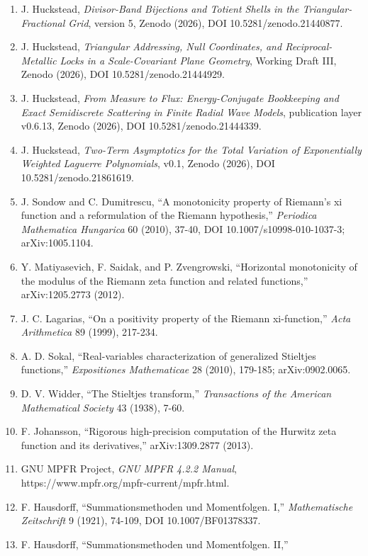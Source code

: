 \documentclass[
  11pt,
]{book}
\begin{document}
\begin{enumerate}
{  Mathematical Society} 296 (1986), 521-541.
\item
  J. Huckstead, \emph{Divisor-Band Bijections and Totient Shells in the
  Triangular-Fractional Grid}, version 5, Zenodo (2026), DOI
  10.5281/zenodo.21440877.
\item
  J. Huckstead, \emph{Triangular Addressing, Null Coordinates, and
  Reciprocal-Metallic Locks in a Scale-Covariant Plane Geometry},
  Working Draft III, Zenodo (2026), DOI 10.5281/zenodo.21444929.
\item
  J. Huckstead, \emph{From Measure to Flux: Energy-Conjugate Bookkeeping
  and Exact Semidiscrete Scattering in Finite Radial Wave Models},
  publication layer v0.6.13, Zenodo (2026), DOI 10.5281/zenodo.21444339.
\item
  J. Huckstead, \emph{Two-Term Asymptotics for the Total Variation of
  Exponentially Weighted Laguerre Polynomials}, v0.1, Zenodo (2026), DOI
  10.5281/zenodo.21861619.
\item
  J. Sondow and C. Dumitrescu, ``A monotonicity property of Riemann's xi
  function and a reformulation of the Riemann hypothesis,''
  \emph{Periodica Mathematica Hungarica} 60 (2010), 37-40, DOI
  10.1007/s10998-010-1037-3; arXiv:1005.1104.
\item
  Y. Matiyasevich, F. Saidak, and P. Zvengrowski, ``Horizontal
  monotonicity of the modulus of the Riemann zeta function and related
  functions,'' arXiv:1205.2773 (2012).
\item
  J. C. Lagarias, ``On a positivity property of the Riemann
  xi-function,'' \emph{Acta Arithmetica} 89 (1999), 217-234.
\item
  A. D. Sokal, ``Real-variables characterization of generalized
  Stieltjes functions,'' \emph{Expositiones Mathematicae} 28 (2010),
  179-185; arXiv:0902.0065.
\item
  D. V. Widder, ``The Stieltjes transform,'' \emph{Transactions of the
  American Mathematical Society} 43 (1938), 7-60.
\item
  F. Johansson, ``Rigorous high-precision computation of the Hurwitz
  zeta function and its derivatives,'' arXiv:1309.2877 (2013).
\item
  GNU MPFR Project, \emph{GNU MPFR 4.2.2 Manual},
  https://www.mpfr.org/mpfr-current/mpfr.html.
\item
  F. Hausdorff, ``Summationsmethoden und Momentfolgen. I,''
  \emph{Mathematische Zeitschrift} 9 (1921), 74-109, DOI
  10.1007/BF01378337.
\item
  F. Hausdorff, ``Summationsmethoden und Momentfolgen. II,''

\end{enumerate}
\end{document}
